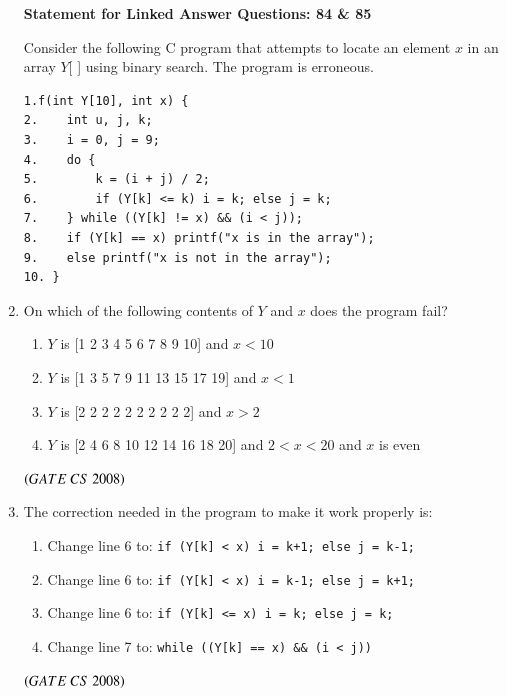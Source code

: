 \documentclass[journal]{IEEEtran}
\numberwithin{equation}{enumi}
\numberwithin{figure}{enumi}
\begin{document}
\begin{enumerate}
\begin{center}
\textbf{Statement for Linked Answer Questions: 84 \& 85}
\end{center}
Consider the following C program that attempts to locate an element $x$ in an array $Y$[ ] using binary search. The program is erroneous.

\begin{verbatim}
1.f(int Y[10], int x) {
2.    int u, j, k;
3.    i = 0, j = 9;
4.    do {
5.        k = (i + j) / 2;
6.        if (Y[k] <= k) i = k; else j = k;
7.    } while ((Y[k] != x) && (i < j));
8.    if (Y[k] == x) printf("x is in the array");
9.    else printf("x is not in the array");
10. }
\end{verbatim}
 

\item On which of the following contents of $Y$ and $x$ does the program fail?

\begin{enumerate}
    \item $Y$ is [1 2 3 4 5 6 7 8 9 10] and $x < 10$
    \item $Y$ is [1 3 5 7 9 11 13 15 17 19] and $x < 1$
    \item $Y$ is [2 2 2 2 2 2 2 2 2 2] and $x > 2$
    \item $Y$ is [2 4 6 8 10 12 14 16 18 20] and $2 < x < 20$ and $x$ is even
\end{enumerate}
\hfill $\left(GATE\ CS\  2008\right)$
 

\item The correction needed in the program to make it work properly is:

\begin{enumerate}
    \item Change line 6 to: \texttt{if (Y[k] < x) i = k+1; else j = k-1;}
    \item Change line 6 to: \texttt{if (Y[k] < x) i = k-1; else j = k+1;}
    \item Change line 6 to: \texttt{if (Y[k] <= x) i = k; else j = k;}
    \item Change line 7 to: \texttt{while ((Y[k] == x) \&\& (i < j))}
\end{enumerate}
\hfill $\left(GATE\ CS\  2008\right)$

\end{enumerate}
\end{document}
